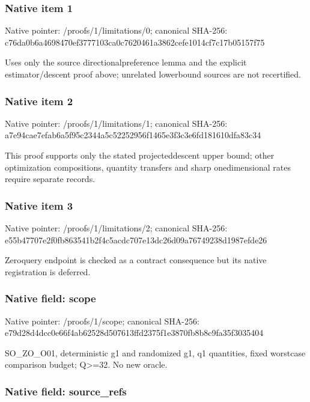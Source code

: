 \documentclass[10pt,a4paper]{article}
\begin{document}
\subsubsection{Native item 1}


Native pointer: /proofs/1/limitations/0; canonical SHA-256: c76da0b6a4698470ef377710\allowbreak{}3ca0c7620461a3862cefe101\allowbreak{}4cf7c17b05157f75


Uses only the source directionalpreference lemma and the explicit estimator/descent proof above; unrelated lowerbound sources are not recertified.


\subsubsection{Native item 2}


Native pointer: /proofs/1/limitations/1; canonical SHA-256: a7e94cae7efab6a5f95c2344\allowbreak{}a5c52252956f1465e3f3c3e6\allowbreak{}fd181610dfa83c34


This proof supports only the stated projecteddescent upper bound; other optimization compositions, quantity transfers and sharp onedimensional rates require separate records.


\subsubsection{Native item 3}


Native pointer: /proofs/1/limitations/2; canonical SHA-256: e55b47707e2f0fb863541b2f\allowbreak{}4c5acdc707e13dc26d09a767\allowbreak{}49238d1987efde26


Zeroquery endpoint is checked as a contract consequence but its native registration is deferred.


\subsubsection{Native field: scope}


Native pointer: /proofs/1/scope; canonical SHA-256: e79d28d4dcc0e66f4ab62528\allowbreak{}d507613ffd2375f1e3870fb8\allowbreak{}b8c9fa35f3035404


SO\_ZO\_O01, deterministic g1 and randomized g1, q1 quantities, fixed worstcase comparison budget; Q>=32. No new oracle.


\subsubsection{Native field: source\_refs}
\end{document}

